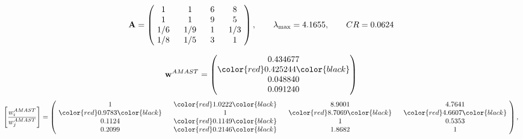 \begin{example}
\begin{equation*}
\mathbf{A} =
\begin{pmatrix}
$\,\,$ 1 $\,\,$ & $\,\,$1$\,\,$ & $\,\,$6$\,\,$ & $\,\,$8 $\,\,$ \\
$\,\,$ 1 $\,\,$ & $\,\,$ 1 $\,\,$ & $\,\,$9$\,\,$ & $\,\,$5 $\,\,$ \\
$\,\,$ 1/6$\,\,$ & $\,\,$ 1/9$\,\,$ & $\,\,$ 1 $\,\,$ & $\,\,$ 1/3 $\,\,$ \\
$\,\,$ 1/8$\,\,$ & $\,\,$ 1/5$\,\,$ & $\,\,$3$\,\,$ & $\,\,$ 1  $\,\,$ \\
\end{pmatrix},
\qquad
\lambda_{\max} =
4.1655,
\qquad
CR = 0.0624
\end{equation*}

\begin{equation*}
\mathbf{w}^{AMAST} =
\begin{pmatrix}
0.434677\\
\color{red} 0.425244\color{black} \\
0.048840\\
0.091240
\end{pmatrix}\end{equation*}
\begin{equation*}
\left[ \frac{{w}^{AMAST}_i}{{w}^{AMAST}_j} \right] =
\begin{pmatrix}
$\,\,$ 1 $\,\,$ & $\,\,$\color{red} 1.0222\color{black} $\,\,$ & $\,\,$8.9001$\,\,$ & $\,\,$4.7641$\,\,$ \\
$\,\,$\color{red} 0.9783\color{black} $\,\,$ & $\,\,$ 1 $\,\,$ & $\,\,$\color{red} 8.7069\color{black} $\,\,$ & $\,\,$\color{red} 4.6607\color{black}   $\,\,$ \\
$\,\,$0.1124$\,\,$ & $\,\,$\color{red} 0.1149\color{black} $\,\,$ & $\,\,$ 1 $\,\,$ & $\,\,$0.5353 $\,\,$ \\
$\,\,$0.2099$\,\,$ & $\,\,$\color{red} 0.2146\color{black} $\,\,$ & $\,\,$1.8682$\,\,$ & $\,\,$ 1  $\,\,$ \\
\end{pmatrix},
\end{equation*}


\end{example}
